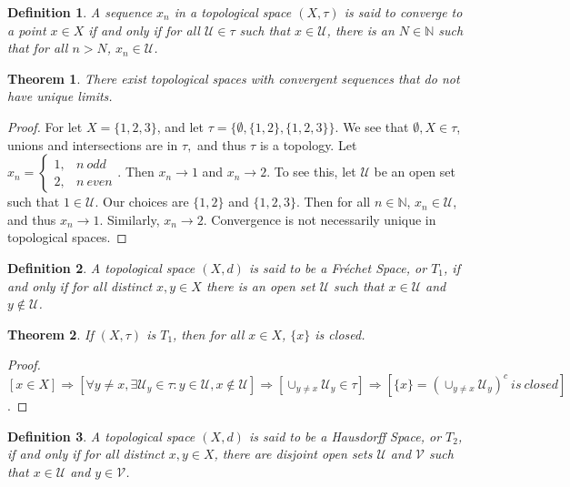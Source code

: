 \documentclass[12pt,oneside]{book}
\theoremstyle{mystyle}
\newtheorem{theorem}{Theorem}[section]
\newtheorem{definition}{Definition}[section]
\begin{document}
\begin{definition}
A sequence $x_n$ in a topological space $(X,\tau)$ is said to converge to a point $x\in X$ if and only if for all $\mathcal{U}\in \tau$ such that $x\in \mathcal{U}$, there is an $N\in \mathbb{N}$ such that for all $n>N$, $x_n \in \mathcal{U}$.
\end{definition}

\begin{theorem}
There exist topological spaces with convergent sequences that do not have unique limits.
\end{theorem}
\begin{proof}
For let $X = \{1,2,3\}$, and let $\tau = \{\emptyset, \{1,2\},\{1,2,3\}\}$. We see that $\emptyset,X\in \tau$, unions and intersections are in $\tau,$ and thus $\tau$ is a topology. Let $x_n = \begin{cases} 1, & n\ odd \\ 2, & n\ even\end{cases}$. Then $x_n \rightarrow 1$ and $x_n \rightarrow 2$. To see this, let $\mathcal{U}$ be an open set such that $1\in \mathcal{U}$. Our choices are $\{1,2\}$ and $\{1,2,3\}$. Then for all $n\in \mathbb{N}$, $x_n \in \mathcal{U}$, and thus $x_n \rightarrow 1$. Similarly, $x_n \rightarrow 2$. Convergence is not necessarily unique in topological spaces.
\end{proof}

\begin{definition}
A topological space $(X,d)$ is said to be a Fr\'{e}chet Space, or $T_1$, if and only if for all distinct $x,y\in X$ there is an open set $\mathcal{U}$ such that $x\in \mathcal{U}$ and $y\notin \mathcal{U}$.
\end{definition}

\begin{theorem}
If $(X,\tau)$ is $T_1$, then for all $x\in X$, $\{x\}$ is closed.
\end{theorem}
\begin{proof}
$[x\in X]\Rightarrow [\forall y\ne x, \exists \mathcal{U}_y\in \tau:y\in \mathcal{U},x\notin\mathcal{U}]\Rightarrow [\cup_{y\ne x}\mathcal{U}_y\in \tau]\Rightarrow [\{x\}=(\cup_{y\ne x}\mathcal{U}_y)^c\ is\ closed]$.
\end{proof}

\begin{definition}
A topological space $(X,d)$ is said to be a Hausdorff Space, or $T_2$, if and only if for all distinct $x,y\in X$, there are disjoint open sets $\mathcal{U}$ and $\mathcal{V}$ such that $x\in \mathcal{U}$ and $y\in \mathcal{V}$.
\end{definition}
\end{document}
